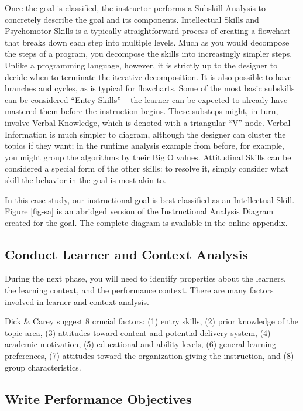 \documentclass{sig-alternate}
\begin{document}
Once the goal is classified, the instructor performs a Subskill Analysis to concretely describe the goal and its components. 
Intellectual Skills and Psychomotor Skills is a typically straightforward process of creating a flowchart that breaks down each step into multiple levels.
Much as you would decompose the steps of a program, you decompose the skills into increasingly simpler steps.
Unlike a programming language, however, it is strictly up to the designer to decide when to terminate the iterative decomposition.
It is also possible to have branches and cycles, as is typical for flowcharts.
Some of the most basic subskills can be considered ``Entry Skills'' -- the learner can be expected to already have mastered them before the instruction begins.
These substeps might, in turn, involve Verbal Knowledge, which is denoted with a triangular ``V'' node.
Verbal Information is much simpler to diagram, although the designer can cluster the topics if they want;
in the runtime analysis example from before, for example, you might group the algorithms by their Big O values.
Attitudinal Skills can be considered a special form of the other skills: to resolve it, simply consider what skill the behavior in the goal is most akin to.

In this case study, our instructional goal is best classified as an Intellectual Skill.
Figure \ref{fig-sa} is an abridged version of the Instructional Analysis Diagram created for the goal.
The complete diagram is available in the online appendix.

\subsection{Conduct Learner and Context Analysis}

During the next phase, you will need to identify properties about the learners, the learning context, and the performance context. 
There are many factors involved in learner and context analysis.

Dick \& Carey suggest 8 crucial factors: (1) entry skills, (2) prior knowledge of the topic 
area, (3) attitudes toward content and potential delivery system, (4) academic 
motivation, (5) educational and ability levels, (6) general learning preferences, 
(7) attitudes toward the organization giving the instruction, and (8) group characteristics.

\subsection{Write Performance Objectives}
\end{document}
